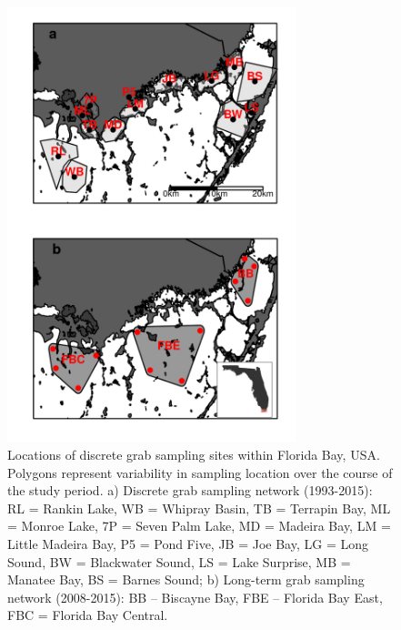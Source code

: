 

%
%

\newpage

\begin{figure}
  \centering
  \includegraphics[width=0.75\textwidth]{../../figures/fbmap.png}
  \caption{Locations of discrete grab sampling sites within Florida Bay, USA. Polygons represent variability in sampling location over the course of the study period. a) Discrete grab sampling network (1993-2015): RL = Rankin Lake, WB = Whipray Basin, TB = Terrapin Bay, ML = Monroe Lake, 7P = Seven Palm Lake, MD = Madeira Bay, LM = Little Madeira Bay, P5 = Pond Five, JB = Joe Bay, LG = Long Sound, BW = Blackwater Sound, LS = Lake Surprise, MB = Manatee Bay, BS = Barnes Sound; b) Long-term grab sampling network (2008-2015): BB – Biscayne Bay, FBE – Florida Bay East, FBC = Florida Bay Central.}
  \label{fig:1}
\end{figure}

